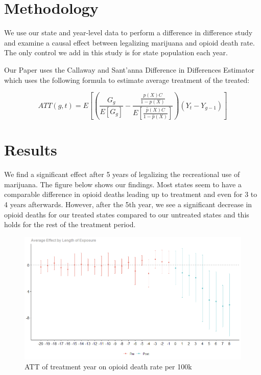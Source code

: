 \documentclass{article}
\begin{document}





\section*{Methodology} %

We use our state and year-level data to perform a difference in difference study and examine a causal effect between legalizing marijuana and opioid death rate. The only control we add in this study is for state population each year. 

Our Paper uses the Callaway and Sant'anna Difference in Differences Estimator which uses the following formula to estimate average treatment of the treated:

$$ATT(g,t)=E[(  \frac{G_g}{ E[G_g]} - \frac{ \frac{ \hat{p} (X)C}{1- \hat{p} (X)}}{E [\frac{\hat{p} (X) C } {1 - \hat{p} (X)}]}) (Y_t - Y_{g-1})]$$

\section*{Results}

We find a significant effect after 5 years of legalizing the recreational use of marijuana. The figure below shows our findings. Most states seem to have a comparable difference in opioid deaths leading up to treatment and even for 3 to 4 years afterwards. However, after the 5th year, we see a significant decrease in opioid deaths for our treated states compared to our untreated states and this holds for the rest of the treatment period. 


\begin{figure}
    \begin{center}
        \includegraphics[width=.85\textwidth]{sc_graph.png}
    \end{center}
    \caption{ATT of treatment year on opioid death rate per 100k}
    \label{fig:graph}
\end{figure}
\end{document}
